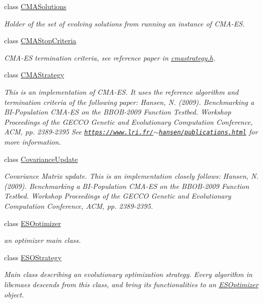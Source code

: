 \begin{DoxyCompactItemize}
class \hyperlink{classlibcmaes_1_1CMASolutions}{C\-M\-A\-Solutions}
\begin{DoxyCompactList}\small\item\em Holder of the set of evolving solutions from running an instance of C\-M\-A-\/\-E\-S. \end{DoxyCompactList}\item 
class \hyperlink{classlibcmaes_1_1CMAStopCriteria}{C\-M\-A\-Stop\-Criteria}
\begin{DoxyCompactList}\small\item\em C\-M\-A-\/\-E\-S termination criteria, see reference paper in \hyperlink{cmastrategy_8h_source}{cmastrategy.\-h}. \end{DoxyCompactList}\item 
class \hyperlink{classlibcmaes_1_1CMAStrategy}{C\-M\-A\-Strategy}
\begin{DoxyCompactList}\small\item\em This is an implementation of C\-M\-A-\/\-E\-S. It uses the reference algorithm and termination criteria of the following paper\-: Hansen, N. (2009). Benchmarking a B\-I-\/\-Population C\-M\-A-\/\-E\-S on the B\-B\-O\-B-\/2009 Function Testbed. Workshop Proceedings of the G\-E\-C\-C\-O Genetic and Evolutionary Computation Conference, A\-C\-M, pp. 2389-\/2395 See \href{https://www.lri.fr/~hansen/publications.html}{\tt https\-://www.\-lri.\-fr/$\sim$hansen/publications.\-html} for more information. \end{DoxyCompactList}\item 
class \hyperlink{classlibcmaes_1_1CovarianceUpdate}{Covariance\-Update}
\begin{DoxyCompactList}\small\item\em Covariance Matrix update. This is an implementation closely follows\-: Hansen, N. (2009). Benchmarking a B\-I-\/\-Population C\-M\-A-\/\-E\-S on the B\-B\-O\-B-\/2009 Function Testbed. Workshop Proceedings of the G\-E\-C\-C\-O Genetic and Evolutionary Computation Conference, A\-C\-M, pp. 2389-\/2395. \end{DoxyCompactList}\item 
class \hyperlink{classlibcmaes_1_1ESOptimizer}{E\-S\-Optimizer}
\begin{DoxyCompactList}\small\item\em an optimizer main class. \end{DoxyCompactList}\item 
class \hyperlink{classlibcmaes_1_1ESOStrategy}{E\-S\-O\-Strategy}
\begin{DoxyCompactList}\small\item\em Main class describing an evolutionary optimization strategy. Every algorithm in libcmaes descends from this class, and bring its functionalities to an \hyperlink{classlibcmaes_1_1ESOptimizer}{E\-S\-Optimizer} object. \end{DoxyCompactList}\item 

\end{DoxyCompactItemize}
